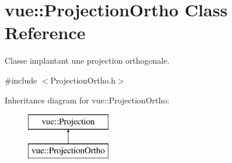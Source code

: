 \hypertarget{classvue_1_1_projection_ortho}{}\section{vue\+:\+:Projection\+Ortho Class Reference}
\label{classvue_1_1_projection_ortho}


Classe implantant une projection orthogonale.  




{\ttfamily \#include $<$Projection\+Ortho.\+h$>$}

Inheritance diagram for vue\+:\+:Projection\+Ortho\+:\begin{figure}[H]
\begin{center}
\leavevmode
\includegraphics[height=2.000000cm]{classvue_1_1_projection_ortho}
\end{center}
\end{figure}
